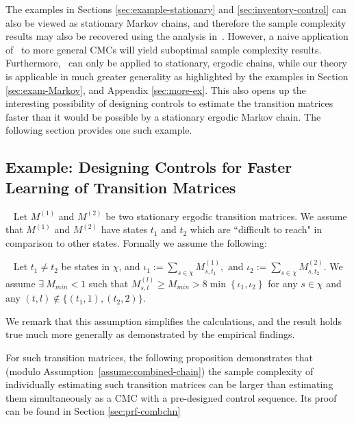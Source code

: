 \documentclass[opre,sglanonrev]{informs4}
\numberwithin{equation}{section}
\newcommand{\pow}[1]{^{(#1)}}
\newcommand{\lc}{\left\{}
\newcommand{\rc}{\right\}}
\begin{document}
{{{{
The examples in Sections \ref{sec:example-stationary} and \ref{sec:inventory-control} can also be viewed as stationary Markov chains, and therefore the sample complexity results may also be recovered using the analysis in~\cite{wolfer2021statistical}. However, a naive application of~\cite{wolfer2021statistical} to more general CMCs will yield suboptimal sample complexity results. Furthermore,~\cite{wolfer2021statistical} can only be applied to stationary, ergodic chains, while our theory is applicable in much greater generality as highlighted by the examples in Section \ref{sec:exam-Markov}, and Appendix \ref{sec:more-ex}. This also opens up the interesting possibility of designing controls to estimate the transition matrices faster than it would be possible by a stationary ergodic Markov chain. The following section provides one such example.} 

{
\subsection{Example: Designing Controls for Faster Learning of Transition Matrices }~\label{sec:control-design}
 Let $M\pow 1$ and $M\pow 2$ be two stationary ergodic transition matrices. We assume that $M\pow 1$ and $M\pow 2$ have states $t_1$ and $t_2$ which are ``difficult to reach" in comparison to other states. Formally we assume the following:

\begin{assumption}~\label{assume:combined-chain}
Let $t_1\neq t_2$ be states in $\chi$, and $\iota_1:= \sum_{s\in\chi}M_{s,t_1}\pow 1,\text{ and }\iota_2:= \sum_{s\in\chi} M_{s,t_2}\pow 2. 
$
We assume $\exists\ M_{min}<1$ such that $ M_{s,t}\pow l\geq M_{min} > 8\min\lc \iota_1,\iota_2 \rc$ for any $s\in\chi$ and any $(t,l)\notin \{(t_1,1),(t_2,2)\}$.\end{assumption}
 \begin{remark}
     We remark that this assumption simplifies the calculations, and the result holds true much more generally as demonstrated by the empirical findings.
 \end{remark}
For such transition matrices, the following proposition demonstrates that (modulo Assumption~\ref{assume:combined-chain}) the sample complexity of individually  estimating such transition matrices can be larger than estimating them simultaneously as a CMC with a pre-designed control sequence. 
% 
% 
Its proof can be found in Section \ref{sec:prf-combchn}

}}}}
\end{document}
